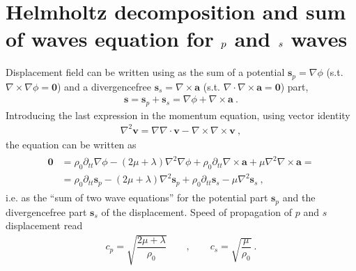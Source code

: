 \documentclass[letterpaper,10pt,english]{jupyterBook}
\begin{document}
\section{Helmholtz decomposition and sum of waves equation for \protect\(p\protect\) and \protect\(s\protect\) waves}
\label{\detokenize{ch/solids/small-displacements-waves:helmholtz-decomposition-and-sum-of-waves-equation-for-p-and-s-waves}}
\sphinxAtStartPar
Displacement field can be written using  as the sum of a potential \(\mathbf{s}_p = \nabla \phi\) (s.t. \(\nabla \times \nabla \phi = \mathbf{0}\)) and a divergence\sphinxhyphen{}free \(\mathbf{s}_s = \nabla \times \mathbf{a}\) (s.t. \(\nabla \cdot \nabla \times \mathbf{a} = \mathbf{0}\)) part,
\begin{equation*}
\begin{split}\mathbf{s} = \mathbf{s}_p + \mathbf{s}_s = \nabla \phi + \nabla \times \mathbf{a} \ .\end{split}
\end{equation*}
\sphinxAtStartPar
Introducing the last expression in the momentum equation, using vector identity
\begin{equation*}
\begin{split}\nabla^2 \mathbf{v} = \nabla \nabla \cdot \mathbf{v} - \nabla \times \nabla \times \mathbf{v} \ , \end{split}
\end{equation*}
\sphinxAtStartPar
the equation can be written as
\begin{equation*}
\begin{split}\begin{aligned}
  \mathbf{0} 
  & = \rho_0 \partial_{tt} \nabla \phi - (2 \mu + \lambda) \nabla^2 \nabla \phi + \rho_0 \partial_{tt} \nabla \times \mathbf{a} + \mu \nabla^2 \nabla \times \mathbf{a} = \\
  & = \rho_0 \partial_{tt} \mathbf{s}_p - (2 \mu + \lambda) \nabla^2 \mathbf{s}_p + \rho_0 \partial_{tt} \mathbf{s}_s - \mu \nabla^2 \mathbf{s}_s \ ,
\end{aligned}\end{split}
\end{equation*}
\sphinxAtStartPar
i.e. as the “sum of two wave equations” for the potential part \(\mathbf{s}_p\) and the divergence\sphinxhyphen{}free part \(\mathbf{s}_s\) of the displacement. Speed of propagation of \(p\)\sphinxhyphen{} and \(s\)\sphinxhyphen{}displacement read
\begin{equation*}
\begin{split}c_p = \sqrt{\dfrac{2 \mu + \lambda}{\rho_0}} \qquad , \qquad c_s = \sqrt{\dfrac{\mu}{\rho_0}} \ .\end{split}
\end{equation*}
\end{document}
